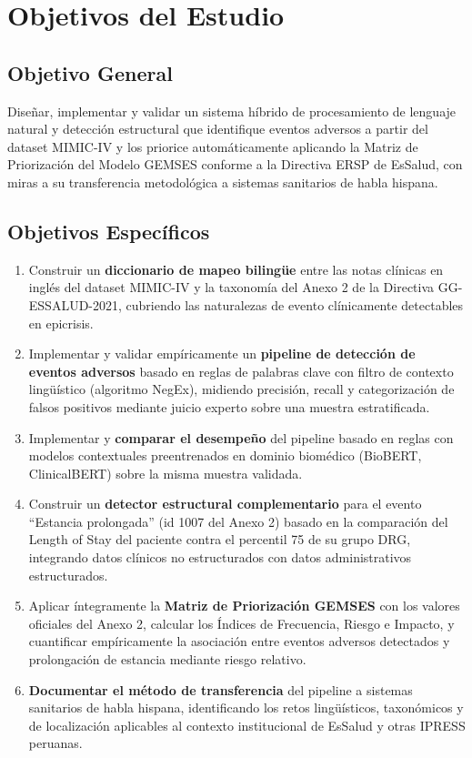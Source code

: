 \section{Objetivos del Estudio}

\subsection{Objetivo General}

Diseñar, implementar y validar un sistema híbrido de procesamiento de lenguaje natural y detección estructural que identifique eventos adversos a partir del dataset MIMIC-IV y los priorice automáticamente aplicando la Matriz de Priorización del Modelo GEMSES conforme a la Directiva ERSP de EsSalud, con miras a su transferencia metodológica a sistemas sanitarios de habla hispana.

\subsection{Objetivos Específicos}

\begin{enumerate}
    \item Construir un \textbf{diccionario de mapeo bilingüe} entre las notas clínicas en inglés del dataset MIMIC-IV y la taxonomía del Anexo 2 de la Directiva GG-ESSALUD-2021, cubriendo las naturalezas de evento clínicamente detectables en epicrisis.
    \item Implementar y validar empíricamente un \textbf{pipeline de detección de eventos adversos} basado en reglas de palabras clave con filtro de contexto lingüístico (algoritmo NegEx), midiendo precisión, recall y categorización de falsos positivos mediante juicio experto sobre una muestra estratificada.
    \item Implementar y \textbf{comparar el desempeño} del pipeline basado en reglas con modelos contextuales preentrenados en dominio biomédico (BioBERT, ClinicalBERT) sobre la misma muestra validada.
    \item Construir un \textbf{detector estructural complementario} para el evento ``Estancia prolongada'' (id 1007 del Anexo 2) basado en la comparación del Length of Stay del paciente contra el percentil 75 de su grupo DRG, integrando datos clínicos no estructurados con datos administrativos estructurados.
    \item Aplicar íntegramente la \textbf{Matriz de Priorización GEMSES} con los valores oficiales del Anexo 2, calcular los Índices de Frecuencia, Riesgo e Impacto, y cuantificar empíricamente la asociación entre eventos adversos detectados y prolongación de estancia mediante riesgo relativo.
    \item \textbf{Documentar el método de transferencia} del pipeline a sistemas sanitarios de habla hispana, identificando los retos lingüísticos, taxonómicos y de localización aplicables al contexto institucional de EsSalud y otras IPRESS peruanas.
\end{enumerate}

